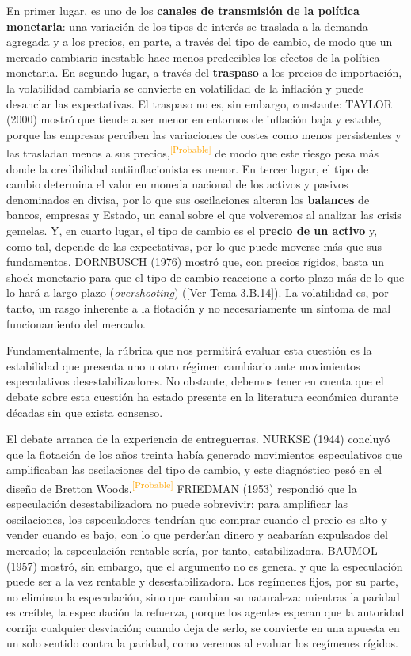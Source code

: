 \documentclass[10pt,a4paper]{article}
\newcommand{\authorfont}[1]{{\fontfamily{EBGaramond-TLF}\selectfont #1}}
\begin{document}
En primer lugar, es uno de los \textbf{canales de transmisión de la política monetaria}: una variación de los tipos de interés se traslada a la demanda agregada y a los precios, en parte, a través del tipo de cambio, de modo que un mercado cambiario inestable hace menos predecibles los efectos de la política monetaria. En segundo lugar, a través del \textbf{traspaso} a los precios de importación, la volatilidad cambiaria se convierte en volatilidad de la inflación y puede desanclar las expectativas. El traspaso no es, sin embargo, constante: TAYLOR (2000) mostró que tiende a ser menor en entornos de inflación baja y estable, porque las empresas perciben las variaciones de costes como menos persistentes y las trasladan menos a sus precios,\textcolor{orange}{\textsuperscript{[Probable]}} de modo que este riesgo pesa más donde la credibilidad antiinflacionista es menor. En tercer lugar, el tipo de cambio determina el valor en moneda nacional de los activos y pasivos denominados en divisa, por lo que sus oscilaciones alteran los \textbf{balances} de bancos, empresas y Estado, un canal sobre el que volveremos al analizar las crisis gemelas. Y, en cuarto lugar, el tipo de cambio es el \textbf{precio de un activo} y, como tal, depende de las expectativas, por lo que puede moverse más que sus fundamentos. DORNBUSCH (1976) mostró que, con precios rígidos, basta un shock monetario para que el tipo de cambio reaccione a corto plazo más de lo que lo hará a largo plazo (\textit{overshooting}) ([\authorfont{Ver Tema 3.B.14}]). La volatilidad es, por tanto, un rasgo inherente a la flotación y no necesariamente un síntoma de mal funcionamiento del mercado.

Fundamentalmente, la rúbrica que nos permitirá evaluar esta cuestión es la estabilidad que presenta uno u otro régimen cambiario ante movimientos especulativos desestabilizadores. No obstante, debemos tener en cuenta que el debate sobre esta cuestión ha estado presente en la literatura económica durante décadas sin que exista consenso.

El debate arranca de la experiencia de entreguerras. NURKSE (1944) concluyó que la flotación de los años treinta había generado movimientos especulativos que amplificaban las oscilaciones del tipo de cambio, y este diagnóstico pesó en el diseño de Bretton Woods.\textcolor{orange}{\textsuperscript{[Probable]}} FRIEDMAN (1953) respondió que la especulación desestabilizadora no puede sobrevivir: para amplificar las oscilaciones, los especuladores tendrían que comprar cuando el precio es alto y vender cuando es bajo, con lo que perderían dinero y acabarían expulsados del mercado; la especulación rentable sería, por tanto, estabilizadora. BAUMOL (1957) mostró, sin embargo, que el argumento no es general y que la especulación puede ser a la vez rentable y desestabilizadora. Los regímenes fijos, por su parte, no eliminan la especulación, sino que cambian su naturaleza: mientras la paridad es creíble, la especulación la refuerza, porque los agentes esperan que la autoridad corrija cualquier desviación; cuando deja de serlo, se convierte en una apuesta en un solo sentido contra la paridad, como veremos al evaluar los regímenes rígidos.
\end{document}
